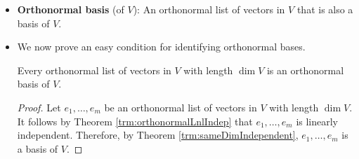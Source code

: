 \documentclass[../main.tex]{subfiles}
\begin{document}
\begin{itemize}
\begin{theorem}
\begin{proof}
            Let $e_1,\dots,e_m$ be an orthonormal list of vectors, and let $a_1,\dots,a_m\in\F$ be such that $a_1e_1+\cdots+a_me_m=0$. Then
            \begin{align*}
                0 &= \norm{0}\\
                &= \norm{a_1e_1+\cdots+a_me_m}\\
                &= |a_1|^2+\cdots+|a_m|^2\tag*{Theorem \ref{trm:normOrthoLnlComb}}
            \end{align*}
            But this implies that each $a_j=0$, as desired.
        \end{proof}
    \end{theorem}
    \item \textbf{Orthonormal basis} (of $V$): An orthonormal list of vectors in $V$ that is also a basis of $V$.
    \item We now prove an easy condition for identifying orthonormal bases.
    \begin{theorem}
        Every orthonormal list of vectors in $V$ with length $\dim V$ is an orthonormal basis of $V$.
        \begin{proof}
            Let $e_1,\dots,e_m$ be an orthonormal list of vectors in $V$ with length $\dim V$. It follows by Theorem \ref{trm:orthonormalLnlIndep} that $e_1,\dots,e_m$ is linearly independent. Therefore, by Theorem \ref{trm:sameDimIndependent}, $e_1,\dots,e_m$ is a basis of $V$.
        \end{proof}
    \end{theorem}
\end{itemize}
\end{document}

